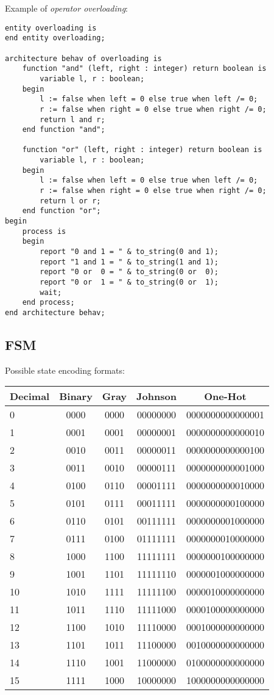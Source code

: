 \documentclass[fontsize=11pt,a4paper]{scrartcl}
\begin{document}
Example of \emph{operator overloading}:
\begin{lstlisting}
entity overloading is
end entity overloading;

architecture behav of overloading is
	function "and" (left, right : integer) return boolean is
		variable l, r : boolean;
	begin
		l := false when left = 0 else true when left /= 0;
		r := false when right = 0 else true when right /= 0;
		return l and r;
	end function "and";

	function "or" (left, right : integer) return boolean is
		variable l, r : boolean;
	begin
		l := false when left = 0 else true when left /= 0;
		r := false when right = 0 else true when right /= 0;
		return l or r;
	end function "or";
begin
	process is
	begin
		report "0 and 1 = " & to_string(0 and 1);
		report "1 and 1 = " & to_string(1 and 1);
		report "0 or  0 = " & to_string(0 or  0);
		report "0 or  1 = " & to_string(0 or  1);
		wait;
	end process;
end architecture behav;
\end{lstlisting}
%
%
%
%
\subsection{FSM}
Possible state encoding formats:

\begin{tabular}{lcccc}
\toprule
\textbf{Decimal} & \textbf{Binary} & \textbf{Gray} & \textbf{Johnson} & \textbf{One-Hot}\\
\midrule
	0  & 0000 & 0000 & 00000000 & 0000000000000001\\
	1  & 0001 & 0001 & 00000001 & 0000000000000010\\
	2  & 0010 & 0011 & 00000011 & 0000000000000100\\
	3  & 0011 & 0010 & 00000111 & 0000000000001000\\
	4  & 0100 & 0110 & 00001111 & 0000000000010000\\
	5  & 0101 & 0111 & 00011111 & 0000000000100000\\
	6  & 0110 & 0101 & 00111111 & 0000000001000000\\
	7  & 0111 & 0100 & 01111111 & 0000000010000000\\
	8  & 1000 & 1100 & 11111111 & 0000000100000000\\
	9  & 1001 & 1101 & 11111110 & 0000001000000000\\
	10 & 1010 & 1111 & 11111100 & 0000010000000000\\
	11 & 1011 & 1110 & 11111000 & 0000100000000000\\
	12 & 1100 & 1010 & 11110000 & 0001000000000000\\
	13 & 1101 & 1011 & 11100000 & 0010000000000000\\
	14 & 1110 & 1001 & 11000000 & 0100000000000000\\
	15 & 1111 & 1000 & 10000000 & 1000000000000000\\
\bottomrule
\end{tabular}
\end{document}
